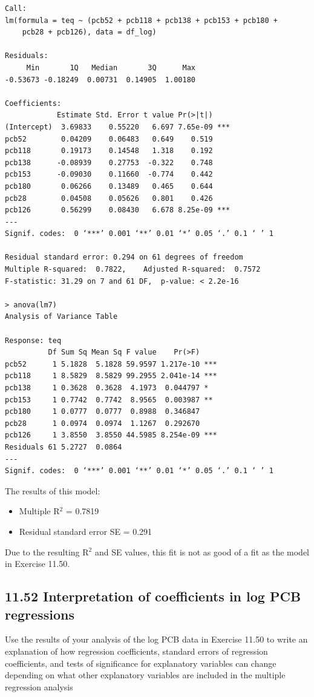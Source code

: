 \documentclass[11pt]{article}
\begin{document}
\begin{verbatim}
Call:
lm(formula = teq ~ (pcb52 + pcb118 + pcb138 + pcb153 + pcb180 + 
    pcb28 + pcb126), data = df_log)

Residuals:
     Min       1Q   Median       3Q      Max 
-0.53673 -0.18249  0.00731  0.14905  1.00180 

Coefficients:
            Estimate Std. Error t value Pr(>|t|)    
(Intercept)  3.69833    0.55220   6.697 7.65e-09 ***
pcb52        0.04209    0.06483   0.649    0.519    
pcb118       0.19173    0.14548   1.318    0.192    
pcb138      -0.08939    0.27753  -0.322    0.748    
pcb153      -0.09030    0.11660  -0.774    0.442    
pcb180       0.06266    0.13489   0.465    0.644    
pcb28        0.04508    0.05626   0.801    0.426    
pcb126       0.56299    0.08430   6.678 8.25e-09 ***
---
Signif. codes:  0 ‘***’ 0.001 ‘**’ 0.01 ‘*’ 0.05 ‘.’ 0.1 ‘ ’ 1

Residual standard error: 0.294 on 61 degrees of freedom
Multiple R-squared:  0.7822,	Adjusted R-squared:  0.7572 
F-statistic: 31.29 on 7 and 61 DF,  p-value: < 2.2e-16

> anova(lm7)
Analysis of Variance Table

Response: teq
          Df Sum Sq Mean Sq F value    Pr(>F)    
pcb52      1 5.1828  5.1828 59.9597 1.217e-10 ***
pcb118     1 8.5829  8.5829 99.2955 2.041e-14 ***
pcb138     1 0.3628  0.3628  4.1973  0.044797 *  
pcb153     1 0.7742  0.7742  8.9565  0.003987 ** 
pcb180     1 0.0777  0.0777  0.8988  0.346847    
pcb28      1 0.0974  0.0974  1.1267  0.292670    
pcb126     1 3.8550  3.8550 44.5985 8.254e-09 ***
Residuals 61 5.2727  0.0864                      
---
Signif. codes:  0 ‘***’ 0.001 ‘**’ 0.01 ‘*’ 0.05 ‘.’ 0.1 ‘ ’ 1
\end{verbatim}
The results of this model: 
\begin{itemize}
\item Multiple R\(^{\text{2}}\) = 0.7819
\item Residual standard error SE = 0.291
\end{itemize}

Due to the resulting R\(^{\text{2}}\) and SE values, this fit is not as good of a fit as the model in Exercise 11.50.

\subsection*{11.52 Interpretation of coefficients in log PCB regressions}
\label{sec:org1605d52}
Use the results of your analysis of the log PCB data in Exercise 11.50 to write an explanation of how regression coefficients, standard errors of regression coefficients, and tests of significance for explanatory variables can change depending on what other explanatory variables are included in the multiple regression analysis 
\end{document}
